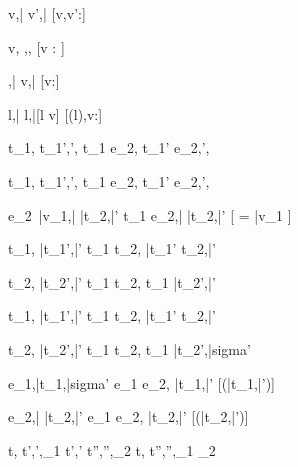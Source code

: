 

  { }
  {\Edit v,\bar{\sigma}  \Edit v',\bar{\sigma}}
  [v,v':\tau]

  { }
  {\Edit v,\sigma \handle{\Empty} \Enter \tau,\sigma,\True}
  [v : \tau]

  { }
  {\Enter \tau,\bar{\sigma}  \Edit v,\bar{\sigma}}
  [v:\tau]

  { }
  {\Update l,\bar{\sigma}  \Update l,\bar{\sigma}[l \mapsto v]}
  [\sigma(l),v:\tau]

  {t_1,\sigma {} t_1',\sigma',\phi}
  {t_1 \Then e_2,\sigma {} t_1' \Then e_2,\sigma',\phi}

  {t_1,\sigma {} t_1',\sigma',\phi}
  {t_1 \Next e_2,\sigma {} t_1' \Next e_2,\sigma',\phi}

  {e_2\ \bar{v_1},\sigma \bar{\normalise} \bar{t_2},\bar{\sigma'}}
  {t_1 \Next e_2,\sigma \bar{\handle{\Continue}} \bar{t_2},\bar{\sigma'}}
  [ = \bar{v_1} \land \neg{}]


  {t_1,\sigma {} \bar{t_1'},\bar{\sigma'}}
  {t_1 \And t_2,\sigma {} \bar{t_1'} \And t_2,\bar{\sigma'}}

  {t_2,\sigma {} \bar{t_2'},\bar{\sigma'}}
  {t_1 \And t_2,\sigma {} t_1 \And \bar{t_2'},\bar{\sigma'}}


  {t_1,\sigma {} \bar{t_1'},\bar{\sigma'}}
  {t_1 \Or t_2,\sigma {} \bar{t_1'} \Or t_2,\bar{\sigma'}}

  {t_2,\sigma {} \bar{t_2'},\bar{\sigma'} }
  {t_1 \Or t_2,\sigma {} t_1 \Or \bar{t_2'},\bar{sigma'}}


  {e_1,\sigma \normalise \bar{t_1},\bar{sigma'}}
  {e_1 \Xor e_2,\sigma \xrightarrow[]{\Left} \bar{t_1},\bar{\sigma'}}
  [\neg\Failing(\bar{t_1},\bar{\sigma'})]

  {e_2,\sigma \bar{\normalise} \bar{t_2},\bar{\sigma'}}
  {e_1 \Xor e_2,\sigma \xrightarrow[]{\Right} \bar{t_2},\bar{\sigma'}}
  [\neg\Failing(\bar{t_2},\bar{\sigma'})]





  {t,\sigma {} t',\sigma',\phi_1 \Quad
   t',\sigma' \normalise t'',\sigma'',\phi_2}
  {t,\sigma {} t'',\sigma'',\phi_1 \land \phi_2}
